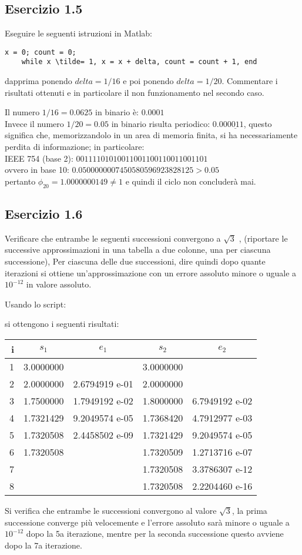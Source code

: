 	\subsection{Esercizio 1.5}
Eseguire le seguenti istruzioni in Matlab:
\begin{lstlisting}[frame=single]
	x = 0; count = 0;	
	while x \tilde= 1, x = x + delta, count = count + 1, end
\end{lstlisting}
dapprima ponendo $delta = 1/16$ e poi ponendo $delta = 1/20$. Commentare i risultati ottenuti e in particolare il non funzionamento nel secondo caso.
\par
Il numero $1/16 = 0.0625$ in binario è: $0.0001$\\
Invece il numero $1/20 = 0.05$ in binario risulta periodico: $0.00\underline{0011}$, questo significa che, memorizzandolo in un area di memoria finita, si ha necessariamente perdita di informazione; in particolare:\\
IEEE 754 (base 2): $00111101010011001100110011001101$\\
ovvero in base 10: $0.0500000007450580596923828125 > 0.05$\\
pertanto $\phi_{20} = 1.0000000149 \neq 1$ e quindi il ciclo non concluderà mai.

	\subsection{Esercizio 1.6}
Verificare che entrambe le seguenti successioni convergono a $\sqrt{3}$ , (riportare le successive approssimazioni in una tabella a due colonne, una per ciascuna successione),
Per ciascuna delle due successioni, dire quindi dopo quante iterazioni si ottiene un’approssimazione con un errore assoluto minore o uguale a $10^{-12}$ in valore assoluto.

\par
Usando lo script:

si ottengono i seguenti risultati:

\begin{tabular}{ r | c | c | c | c }
		
  \textbf{i} & \textbf{$s_1$} & \textbf{$e_1$} & \textbf{$s_2$} & \textbf{$e_2$} \\
  \hline	
  	1 & 3.0000000 &                & 3.0000000 &               \\
	2 & 2.0000000 & 2.6794919 e-01 & 2.0000000 &               \\
	3 & 1.7500000 & 1.7949192 e-02 & 1.8000000 & 6.7949192 e-02\\
	4 & 1.7321429 & 9.2049574 e-05 & 1.7368420 & 4.7912977 e-03\\
	5 & 1.7320508 & 2.4458502 e-09 & 1.7321429 & 9.2049574 e-05\\
	6 & 1.7320508 &                & 1.7320509 & 1.2713716 e-07\\
	7 &           &                & 1.7320508 & 3.3786307 e-12\\
	8 &           &                & 1.7320508 & 2.2204460 e-16\\
  \hline  
\end{tabular}

Si verifica che entrambe le successioni convergono al valore $\sqrt{3}$, la prima successione converge più velocemente e l'errore assoluto sarà minore o uguale a $10^{-12}$ dopo la 5a iterazione, mentre per la seconda successione questo avviene dopo la 7a iterazione.